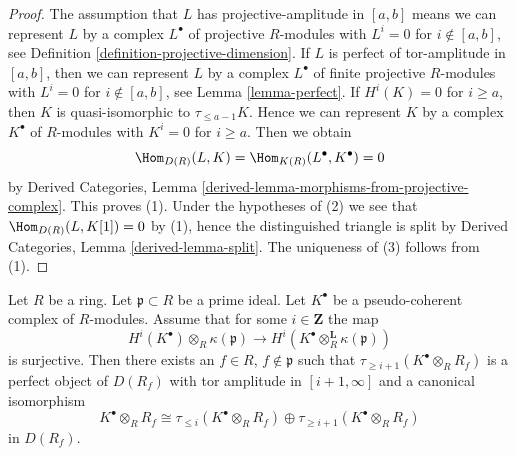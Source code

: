\begin{proof}
The assumption that $L$ has projective-amplitude in $[a, b]$ means we
can represent $L$ by a complex $L^\bullet$ of projective $R$-modules
with $L^i = 0$ for $i \not \in [a, b]$, see Definition
\ref{definition-projective-dimension}.
If $L$ is perfect of tor-amplitude in $[a, b]$, then
we can represent $L$ by a complex $L^\bullet$ of finite projective $R$-modules
with $L^i = 0$ for $i \not \in [a, b]$, see Lemma \ref{lemma-perfect}.
If $H^i(K) = 0$ for $i \geq a$, then $K$ is quasi-isomorphic
to $\tau_{\leq a - 1}K$. Hence we can represent $K$ by a complex
$K^\bullet$ of $R$-modules with $K^i = 0$ for $i \geq a$. Then we obtain
$$
\Hom_{D(R)}(L, K) = \Hom_{K(R)}(L^\bullet, K^\bullet) = 0
$$
by Derived Categories, Lemma
\ref{derived-lemma-morphisms-from-projective-complex}.
This proves (1). Under the hypotheses of (2) we see that
$\Hom_{D(R)}(L, K[1]) = 0$ by (1), hence
the distinguished triangle is split by
Derived Categories, Lemma \ref{derived-lemma-split}.
The uniqueness of (3) follows from (1).
\end{proof}

\begin{lemma}
\label{lemma-better-cut-complex-in-two}
Let $R$ be a ring. Let $\mathfrak p \subset R$ be a prime ideal.
Let $K^\bullet$ be a pseudo-coherent complex of $R$-modules.
Assume that for some $i \in \mathbf{Z}$ the map
$$
H^i(K^\bullet) \otimes_R \kappa(\mathfrak p)
\longrightarrow
H^i(K^\bullet \otimes_R^{\mathbf{L}} \kappa(\mathfrak p))
$$
is surjective. Then there exists an $f \in R$, $f \not \in \mathfrak p$
such that $\tau_{\geq i + 1}(K^\bullet \otimes_R R_f)$ is a perfect
object of $D(R_f)$ with tor amplitude in $[i + 1, \infty]$ and
a canonical isomorphism
$$
K^\bullet \otimes_R R_f \cong
\tau_{\leq i}(K^\bullet \otimes_R R_f) \oplus
\tau_{\geq i + 1}(K^\bullet \otimes_R R_f)
$$
in $D(R_f)$.
\end{lemma}

